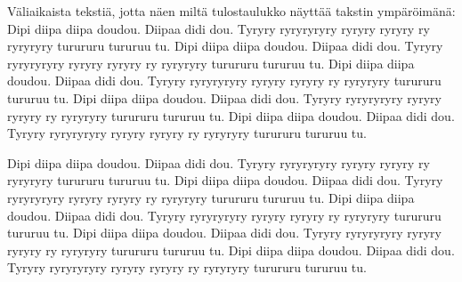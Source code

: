 Väliaikaista tekstiä, jotta näen miltä tulostaulukko näyttää takstin ympäröimänä:
Dipi diipa diipa doudou. Diipaa didi dou. Tyryry ryryryryry ryryry ryryry ry ryryryry turururu tururuu tu.
Dipi diipa diipa doudou. Diipaa didi dou. Tyryry ryryryryry ryryry ryryry ry ryryryry turururu tururuu tu.
Dipi diipa diipa doudou. Diipaa didi dou. Tyryry ryryryryry ryryry ryryry ry ryryryry turururu tururuu tu.
Dipi diipa diipa doudou. Diipaa didi dou. Tyryry ryryryryry ryryry ryryry ry ryryryry turururu tururuu tu.
Dipi diipa diipa doudou. Diipaa didi dou. Tyryry ryryryryry ryryry ryryry ry ryryryry turururu tururuu tu.
\par

Dipi diipa diipa doudou. Diipaa didi dou. Tyryry ryryryryry ryryry ryryry ry ryryryry turururu tururuu tu.
Dipi diipa diipa doudou. Diipaa didi dou. Tyryry ryryryryry ryryry ryryry ry ryryryry turururu tururuu tu.
Dipi diipa diipa doudou. Diipaa didi dou. Tyryry ryryryryry ryryry ryryry ry ryryryry turururu tururuu tu.
Dipi diipa diipa doudou. Diipaa didi dou. Tyryry ryryryryry ryryry ryryry ry ryryryry turururu tururuu tu.
Dipi diipa diipa doudou. Diipaa didi dou. Tyryry ryryryryry ryryry ryryry ry ryryryry turururu tururuu tu.

